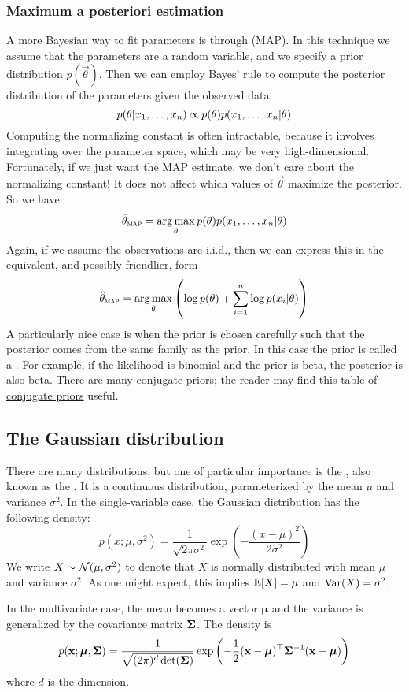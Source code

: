 \subsubsection{Maximum a posteriori estimation}
A more Bayesian way to fit parameters is through  (MAP).
In this technique we assume that the parameters are a random variable, and we specify a prior distribution $p(\vec{\theta})$.
Then we can employ Bayes' rule to compute the posterior distribution of the parameters given the observed data:
\[p(\mathbf{\theta} | x_1, \dots, x_n) \propto p(\mathbf{\theta})p(x_1, \dots, x_n | \mathbf{\theta})\]
Computing the normalizing constant is often intractable, because it involves integrating over the parameter space, which may be very high-dimensional.
Fortunately, if we just want the MAP estimate, we don't care about the normalizing constant!
It does not affect which values of $\vec{\theta}$ maximize the posterior.
So we have
\[\hat{\mathbf{\theta}}_\textsc{map} = \operatorname*{arg\,max}_{\mathbf{\theta}} p(\mathbf{\theta})p(x_1, \dots, x_n | \mathbf{\theta})\]
Again, if we assume the observations are i.i.d., then we can express this in the equivalent, and possibly friendlier, form
\[\hat{\mathbf{\theta}}_\textsc{map} = \operatorname*{arg\,max}_{\mathbf{\theta}} \left(\log p(\mathbf{\theta}) + \sum_{i=1}^n \log p(x_i | \mathbf{\theta})\right)\]
A particularly nice case is when the prior is chosen carefully such that the posterior comes from the same family as the prior.
In this case the prior is called a .
For example, if the likelihood is binomial and the prior is beta, the posterior is also beta.
There are many conjugate priors; the reader may find this \href{https://en.wikipedia.org/wiki/Conjugate_prior#Table_of_conjugate_distributions}{table of conjugate priors} useful.

\subsection{The Gaussian distribution}
There are many distributions, but one of particular importance is the , also known as the .
It is a continuous distribution, parameterized by the mean $\mu$ and variance $\sigma^2$.
In the single-variable case, the Gaussian distribution has the following density:
\[p(x; \mu, \sigma^2) = \frac{1}{\sqrt{2\pi\sigma^2}}\exp\left(-\frac{(x-\mu)^2}{2\sigma^2}\right)\]
We write $X \sim \mathcal{N}(\mu, \sigma^2)$ to denote that $X$ is normally distributed with mean $\mu$ and variance $\sigma^2$.
As one might expect, this implies $\mathbb{E}[X] = \mu$ and $\operatorname{Var}(X) = \sigma^2$.

In the multivariate case, the mean becomes a vector $\bm\mu$ and the variance is generalized by the covariance matrix $\mathbf{\Sigma}$.
The density is
\[p(\mathbf{x}; \bm\mu, \mathbf{\Sigma}) = \frac{1}{\sqrt{(2\pi)^d \det(\mathbf{\Sigma})}}\exp\left(-\frac{1}{2}(\mathbf{x} - \bm\mu)^\top\mathbf{\Sigma}^{-1}(\mathbf{x} - \bm\mu)\right)\]
where $d$ is the dimension.
